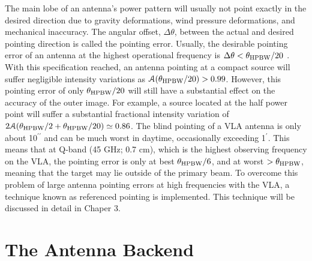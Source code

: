 The main lobe of an antenna's power pattern will usually not point exactly in the desired direction due to gravity deformations, wind pressure deformations, and mechanical inaccuracy. The angular offset, $\Delta \theta$, between the actual and desired pointing direction is called the pointing error. Usually, the desirable pointing error of  an antenna at the highest operational frequency is $\Delta \theta < \theta _{\rm{HPBW}}/20$ \citep{taylor_1999}. With this specification reached, an antenna pointing at a compact source will suffer negligible intensity variations as $\mathcal{A}(\theta _{\rm{HPBW}}/20) > 0.99$. However, this pointing error of only $\theta _{\rm{HPBW}}/20$ will still have a substantial effect on the accuracy of the outer image. For example, a source located at the half power point will suffer a substantial fractional intensity variation of $2\mathcal{A}(\theta _{\rm{HPBW}}/2+\theta _{\rm{HPBW}}/20) \simeq 0.86$. The blind pointing of a VLA antenna is only about 10$^{\prime\prime}$ and can be much worst in daytime, occasionally exceeding 1$^{\prime}$. This means that at Q-band (45 GHz; 0.7 cm), which is the highest observing frequency on the VLA, the pointing error is only at best $\theta _{\rm{HPBW}}/6$, and at worst $>\theta _{\rm{HPBW}}$, meaning that the target may lie outside of the primary beam. To overcome this problem of large antenna pointing errors at high frequencies with the VLA, a technique known as referenced pointing is implemented. This technique will be discussed in detail in Chaper 3. 

\section{The Antenna Backend}\label{sec:2}

